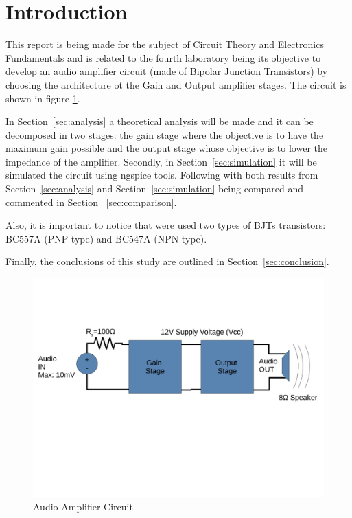 \section{Introduction}
\label{sec:introduction}


\hspace{0,5cm} This report is being made for the subject of Circuit Theory and Electronics Fundamentals and is related to the fourth laboratory being its objective to develop an audio amplifier circuit (made of Bipolar Junction Transistors) by choosing the architecture ot the Gain and Output amplifier stages. The circuit is shown in figure \ref{fig:circuito}.
\par In Section~\ref{sec:analysis} a theoretical analysis will be made and it can be decomposed in two stages: the gain stage where the objective is to have the maximum gain possible and the output stage whose objective is to lower the impedance of the amplifier. Secondly, in Section~\ref{sec:simulation} it will be simulated the circuit using ngspice tools. Following with both results from Section~\ref{sec:analysis} and Section~\ref{sec:simulation} being compared and commented in Section ~\ref{sec:comparison}. 
\par Also, it is important to notice that were used two types of BJTs transistors: BC557A (PNP type) and BC547A (NPN type).
\par Finally, the conclusions of this study are outlined in Section~\ref{sec:conclusion}.

\begin{figure}[H] \centering
\includegraphics[width=1\linewidth]{circuito.pdf}
\caption{Audio Amplifier Circuit}
\label{fig:circuito}
\end{figure}


